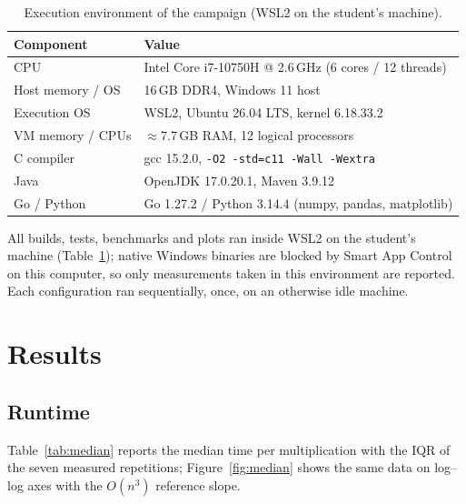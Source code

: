 \documentclass[11pt,a4paper]{article}
\begin{document}
\begin{table}[t]
\centering
\caption{Execution environment of the campaign (WSL2 on the student's
machine).}
\label{tab:env}
\footnotesize
\begin{tabular}{@{}ll@{}}
\toprule
Component & Value \\
\midrule
CPU & Intel Core i7-10750H @ 2.6\,GHz (6 cores / 12 threads) \\
Host memory / OS & 16\,GB DDR4, Windows 11 host \\
Execution OS & WSL2, Ubuntu 26.04 LTS, kernel 6.18.33.2 \\
VM memory / CPUs & \(\approx\)7.7\,GB RAM, 12 logical processors \\
C compiler & gcc 15.2.0, \texttt{-O2 -std=c11 -Wall -Wextra} \\
Java & OpenJDK 17.0.20.1, Maven 3.9.12 \\
Go / Python & Go 1.27.2 / Python 3.14.4 (numpy, pandas, matplotlib) \\
\bottomrule
\end{tabular}
\end{table}

All builds, tests, benchmarks and plots ran inside WSL2 on the student's
machine (Table~\ref{tab:env}); native Windows binaries are blocked by Smart App
Control on this computer, so only measurements taken in this environment are
reported. Each configuration ran sequentially, once, on an otherwise idle
machine.

\section{Results}

\subsection{Runtime}

Table~\ref{tab:median} reports the median time per multiplication with the IQR
of the seven measured repetitions; Figure~\ref{fig:median} shows the same data
on log--log axes with the \(O(n^3)\) reference slope.
\end{document}
